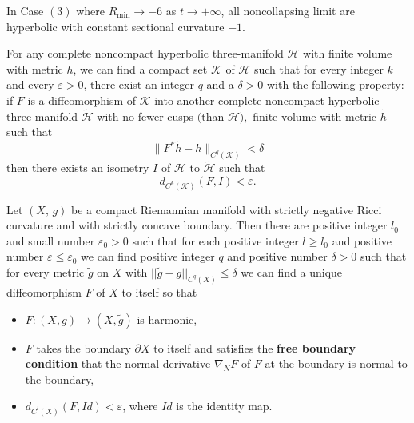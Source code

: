 \begin{lemma} 
  \label{lem:cz-noncollapsing-limits-hyperbolic}

In Case $(3)$ where $R_{\min}\rightarrow-6$ as $t\rightarrow
+\infty$, all noncollapsing limit are hyperbolic with constant
sectional curvature $-1.$
\end{lemma}
\begin{lemma}
  \label{lem:cz-finite-volume-hyperbolic-embedding-stability}
 For any complete noncompact
hyperbolic three-manifold $\mathcal{H}$ with finite volume with
metric $h$, we can find a compact set $\mathcal{K}$ of
$\mathcal{H}$ such that for every integer $k$ and every
$\varepsilon>0$, there exist an integer $q$ and a $\delta>0$ with
the following property: if $F$ is a diffeomorphism of
$\mathcal{K}$ into another complete noncompact hyperbolic
three-manifold $\tilde{\mathcal{H}}$ with no fewer cusps $($than
$\mathcal{H}),$ finite volume with metric $\tilde{h}$ such that
$$
\|F^*\tilde{h}-h\|_{C^q(\mathcal{K})}<\delta
$$
then there exists an isometry $I$ of $\mathcal{H}$ to
$\tilde{\mathcal{H}}$ such that
$$
d_{C^k(\mathcal{K})}(F,I)<\varepsilon.
$$
\end{lemma}
\begin{lemma} 
  \label{lem:cz-concave-boundary-metric-perturbations}

Let\; $(X,\,g)$\; be\; a\; compact\; Riemannian\; manifold\; with
strictly negative Ricci curvature and with strictly concave
boundary. Then there are positive integer $l_0$ and small number
$\varepsilon_0>0$ such that for each positive integer $l\ge l_0$ and
positive number $\varepsilon\le\varepsilon_0$ we can find positive
integer $q$ and positive number $\delta>0$ such that for every
metric $\tilde{g}$ on $X$ with $||\tilde{g}-g||_{C^q(X)}\le \delta$
we can find a unique diffeomorphism $F$ of $X$ to itself so that
\begin{itemize}
\item[(a)] $F: (X,g)\rightarrow (X,\tilde{g})$ is harmonic,
\item[(b)] $F$ takes the boundary $\partial X$ to itself and
satisfies the {\bf free boundary condition} that the normal derivative $\nabla_NF$ of $F$ at the
boundary is normal to the boundary, \item[(c)]
$d_{C^l(X)}(F,Id)<\varepsilon$, where $Id$ is the identity map.
\end{itemize}
\end{lemma}
